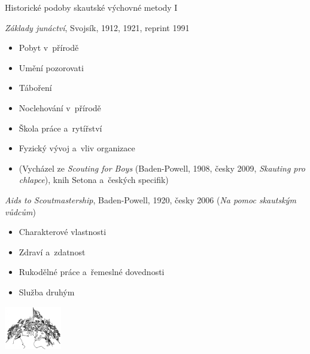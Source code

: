 \documentclass[compress, ucs, xelatex, 11pt, xcolor=dvipsnames, print, aspectratio=169,
	hyperref={
		bookmarks=true,
		unicode=true,
		colorlinks=true,
		pdftitle={Skautska vychovna metoda},
		plainpages=false,
		pdfauthor={Vojtech Zeisek},
		pdfsubject={Skautska vychovna metoda a jeji vyvoj za posledni stoleti a desetileti},
		pdfcreator={XeLaTeX},
		pdfkeywords={Junak, Pedagogika, Skaut, Skauting, Vychovna metoda},
		linkcolor=Red, %
		anchorcolor=ForestGreen, %
		citecolor=ForestGreen, %
		filecolor=ForestGreen, %
		menucolor=ForestGreen, %
		urlcolor=Sepia, %
		pdftex},
	url={hyphens, lowtilde} %
	]{beamer}
\begin{document}
\begin{frame}{Historické podoby skautské výchovné metody I}
	\begin{multicols}{2}
		\textit{Základy junáctví}, Svojsík, 1912, 1921, reprint 1991
		\begin{itemize}
			\item Pobyt v~přírodě
			\item Umění pozorovati
			\item Táboření
			\item Noclehování v~přírodě
			\item Škola práce a~rytířství
			\item Fyzický vývoj a~vliv organizace
			\item (Vycházel ze \textit{Scouting for Boys} (Baden-Powell, 1908, česky 2009, \textit{Skauting pro chlapce}), knih Setona a~českých specifik)
		\end{itemize}
		\columnbreak
		\textit{Aids to Scoutmastership}, Baden-Powell, 1920, česky 2006 (\textit{Na pomoc skautským vůdcům})
		\begin{itemize}
			\item Charakterové vlastnosti
			\item Zdraví a~zdatnost
			\item Rukodělné práce a~řemeslné dovednosti
			\item Služba druhým
		\end{itemize}
		\begin{center}
			\includegraphics[width=2.5cm]{sireni.png}
		\end{center}
	\end{multicols}
\end{frame}
\end{document}
